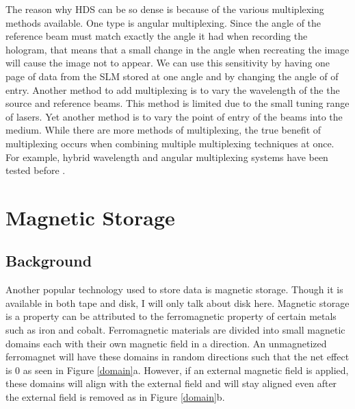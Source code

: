 \documentclass[ notitlepage, numerical, 11pt]{revtex4-1} %
\begin{document}
The reason why HDS can be so dense is because of the various multiplexing methods available. One type is angular multiplexing. Since the angle of the reference beam must match exactly the angle it had when recording the hologram, that means that a small change in the angle when recreating the image will cause the image not to appear. We can use this sensitivity by having one page of data from the SLM stored at one angle and by changing the angle of of entry. Another method to add multiplexing is to vary the wavelength of the the source and reference beams. This method is limited due to the small tuning range of lasers. Yet another method is to vary the point of entry of the beams into the medium. While there are more methods of multiplexing, the true benefit of multiplexing occurs when combining multiple multiplexing techniques at once. For example, hybrid wavelength and angular multiplexing systems have been tested before \cite{memory}. 


\section{Magnetic Storage}
\subsection{Background}
Another popular technology used to store data is magnetic storage. Though it is available in both tape and disk, I will only talk about disk here. Magnetic storage is a property can be attributed to the ferromagnetic property of certain metals such as iron and cobalt. Ferromagnetic materials are divided into small magnetic domains each with their own magnetic field in a direction. An unmagnetized ferromagnet will have these domains in random directions such that the net effect is 0 as seen in Figure \ref{domain}a. However, if an external magnetic field is applied, these domains will align with the external field and will stay aligned even after the external field is removed as in Figure \ref{domain}b.
\end{document}
